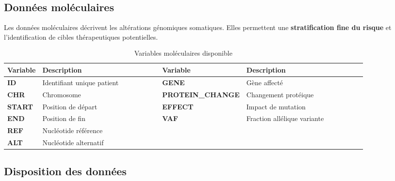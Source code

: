 \documentclass[12pt,a4paper]{article}
\begin{document}
\subsection{Données moléculaires}

Les données moléculaires décrivent les altérations génomiques somatiques. Elles permettent une \textbf{stratification fine du risque} et l'identification de cibles thérapeutiques potentielles.

\begin{table}[H]
\centering
\footnotesize
\begin{tabular}{>{\bfseries}l p{0.43\linewidth} >{\bfseries}l p{0.43\linewidth}}
\toprule
\textbf{Variable} & \textbf{Description} & \textbf{Variable} & \textbf{Description} \\
\midrule
ID & Identifiant unique patient & GENE & Gène affecté\\
CHR & Chromosome & PROTEIN\_CHANGE & Changement protéique \\
START & Position de départ & EFFECT & Impact de mutation \\
END & Position de fin & VAF & Fraction allélique variante \\
REF & Nucléotide référence  \\
ALT & Nucléotide alternatif & & \\
\bottomrule
\end{tabular}
\caption{Variables moléculaires disponible}
\end{table}

\subsection{Disposition des données}
\end{document}

